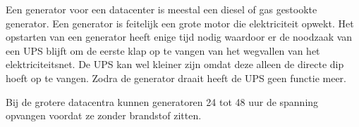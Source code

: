 Een generator voor een datacenter is meestal een diesel of gas gestookte generator. Een generator is feitelijk een grote motor die elektriciteit opwekt. Het opstarten van een generator heeft enige tijd nodig waardoor er de noodzaak van een UPS blijft om de eerste klap op te vangen van het wegvallen van het elektriciteitsnet. De UPS kan wel kleiner zijn omdat deze alleen de directe dip hoeft op te vangen. Zodra de generator draait heeft de UPS geen functie meer.

Bij de grotere datacentra kunnen generatoren 24 tot 48 uur de spanning opvangen voordat ze zonder brandstof zitten.
